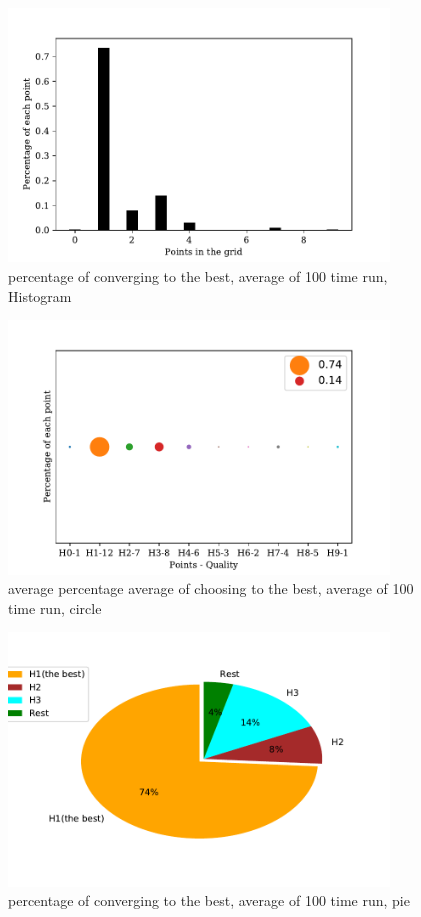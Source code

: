 \documentclass[a4paper,12pt]{article}
\begin{document}
	\begin{figure}[H]
		\centering
		\includegraphics[width=0.9\textwidth]{average_percentage200_3000}
		\caption{percentage of converging to the best, average of 100 time run, Histogram}\label{average_percentage200_3000}
	\end{figure}
	\begin{figure}[H]
		\centering
		\includegraphics[width=0.9\textwidth]{average_percentage200_3000_2}
		\caption{average percentage average of choosing to the best, average of 100 time run, circle}\label{average_percentage200_3000_2}
	\end{figure}
	\begin{figure}[H]
	\centering
	\includegraphics[width=0.9\textwidth]{average_percentage200_3000_3}
	\caption{percentage of converging to the best, average of 100 time run, pie}\label{average_percentage200_3000_3}
	\end{figure}
\end{document}
